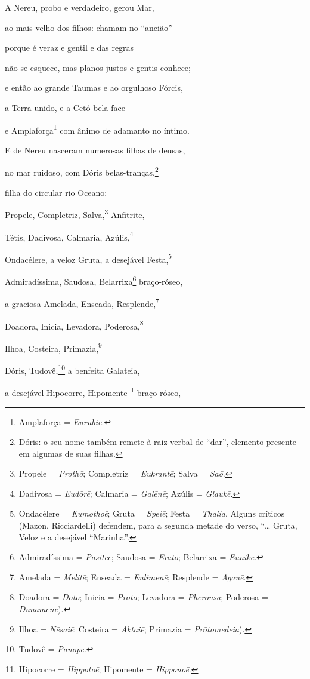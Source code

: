 \begin{pages}
\begin{Rightside}
\medskip

A Nereu, probo e verdadeiro, gerou Mar,

ao mais velho dos filhos: chamam-no ``ancião''

porque é veraz e gentil e das regras 

não se esquece, mas planos justos e gentis conhece;

e então ao grande Taumas e ao orgulhoso Fórcis,

a Terra unido, e a Cetó bela-face

e Amplaforça\footnote{Amplaforça = \emph{Eurubiē}.} com ânimo de adamanto no íntimo.

E de Nereu nasceram numerosas filhas de deusas, 

no mar ruidoso, com Dóris belas-tranças,\footnote{Dóris: o seu nome também remete à raiz verbal de ``dar'', elemento presente em algumas de suas filhas.}

filha do circular rio Oceano:

Propele, Completriz, Salva,\footnote{Propele = \emph{Prothō}; Completriz = \emph{Eukrantē}; Salva = \emph{Saō}.} Anfitrite,

Tétis, Dadivosa, Calmaria, Azúlis,\footnote{Dadivosa = \emph{Eudōrē}; Calmaria = \emph{Galēnē}; Azúlis = \emph{Glaukē}.}

Ondacélere, a veloz Gruta, a desejável Festa,\footnote{Ondacélere = \emph{Kumothoē}; Gruta = \emph{Speiē}; Festa = \emph{Thalia}. Alguns críticos (Mazon, Ricciardelli) defendem, para a segunda metade do verso, ``\ldots{} Gruta, Veloz e a desejável ``Marinha''.} 

Admiradíssima, Saudosa, Belarrixa\footnote{Admiradíssima = \emph{Pasiteē}; Saudosa = \emph{Eratō}; Belarrixa = \emph{Eunikē}.} braço-róseo,

a graciosa Amelada, Enseada, Resplende,\footnote{Amelada = \emph{Melitē}; Enseada = \emph{Eulimenē}; Resplende = \emph{Agauē}.}

Doadora, Inicia, Levadora, Poderosa,\footnote{Doadora = \emph{Dōtō}; Inicia = \emph{Prōtō}; Levadora = \emph{Pherousa}; Poderosa = \emph{Dunamenē}).}

Ilhoa, Costeira, Primazia,\footnote{Ilhoa = \emph{Nēsaiē}; Costeira = \emph{Aktaiē}; Primazia = \emph{Prōtomedeia}).}

Dóris, Tudovê,\footnote{Tudovê = \emph{Panopē}.} a benfeita Galateia, 

a desejável Hipocorre, Hipomente\footnote{Hipocorre = \emph{Hippotoē}; Hipomente =
\emph{Hipponoē}.} braço-róseo,


\end{Rightside}
\end{pages}
